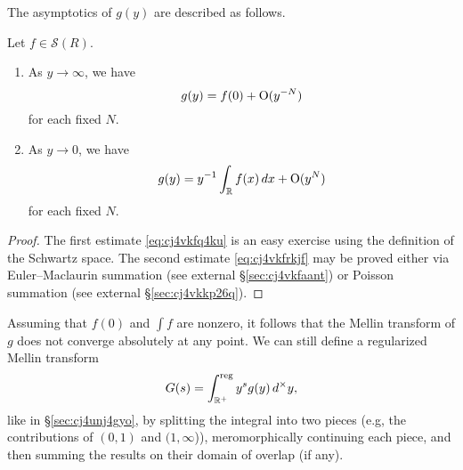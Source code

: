 \documentclass[reqno]{amsart}  \numberwithin{theorem}{section} \numberwithin{equation}{section}
\begin{document}
The asymptotics of $g(y)$ are described as follows.
\begin{lemma}\label{lemma:cj56e5j5uq}
  Let $f \in \mathcal{S}(R)$.
  \begin{enumerate}
  \item As $y \rightarrow \infty$, we have
    \begin{equation}\label{eq:cj4vkfq4ku}
      g(y) = f(0) + \operatorname{O}(y^{-N})
    \end{equation}
    for each fixed $N$.
  \item As $y \rightarrow 0$, we have
    \begin{equation}\label{eq:cj4vkfrkjf}
      g(y) = y^{-1} \int_{\mathbb{R} } f(x) \, d x  + \operatorname{O} (y^{N})
    \end{equation}
    for each fixed $N$.
  \end{enumerate}
\end{lemma}
\begin{proof}
  The first estimate \eqref{eq:cj4vkfq4ku} is an easy exercise using the definition of the Schwartz space.  The second estimate \eqref{eq:cj4vkfrkjf} may be proved either via Euler--Maclaurin summation (see external \S\ref{sec:cj4vkfaant}) or Poisson summation (see external \S\ref{sec:cj4vkkp26q}).
\end{proof}

Assuming that $f(0)$ and $\int f$ are nonzero, it follows that the Mellin transform of $g$ does not converge absolutely at any point.  We can still define a regularized Mellin transform
\begin{equation*}
  G(s) = \int_{\mathbb{R}^+ }^{\operatorname{reg}} y^s g (y) \,d^\times y,
\end{equation*}
like in \S\ref{sec:cj4unj4gyo}, by splitting the integral into two pieces (e.g, the contributions of $(0,1)$ and $(1,\infty$)), meromorphically continuing each piece, and then summing the results on their domain of overlap (if any).
\end{document}
